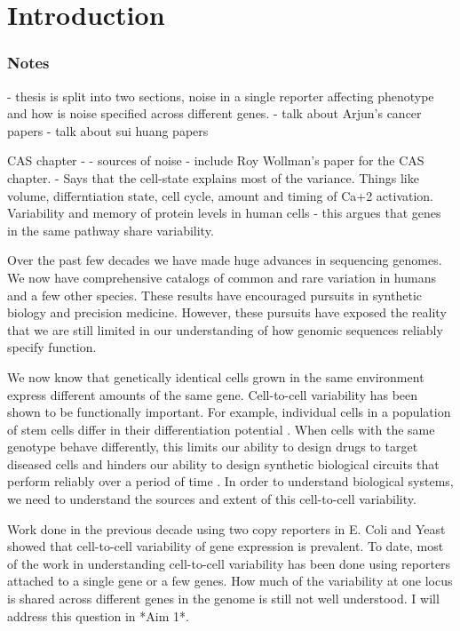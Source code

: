 \chapter{Introduction}
\label{chap:introduction}
\tightlists


\subsection{Notes}
- thesis is split into two sections, noise in a single reporter affecting phenotype and how is noise specified across different genes.
- talk about Arjun's cancer papers
- talk about sui huang papers


CAS chapter - - sources of noise
- include Roy Wollman's paper for the CAS chapter. 
    - Says that the cell-state explains most of the variance. Things like volume, differntiation state, cell cycle, amount and timing of Ca+2 activation.
Variability and memory of protein levels in human cells - this argues that genes in the same pathway share variability.


    



Over the past few decades we have made huge advances in sequencing genomes. We now have  comprehensive catalogs of common and rare variation in humans and a few other species. These results have encouraged pursuits in synthetic biology and precision medicine. However, these pursuits have exposed the reality that we are still limited in our understanding of how genomic sequences reliably specify function. 

We now know that genetically identical cells grown in the same environment express different amounts of the same gene. Cell-to-cell variability has been shown to be functionally important. For example, individual cells in a population of stem cells differ in their differentiation potential \cite{chang_transcriptome-wide_2008}. When cells with the same genotype behave differently, this limits our ability to design drugs to target diseased cells and hinders our ability to design synthetic biological circuits that perform reliably over a period of time \cite{elowitz_synthetic_2000}. In order to understand biological systems, we need to understand the sources and extent of this cell-to-cell variability.

Work done in the previous decade using two copy reporters in E. Coli \cite{elowitz_stochastic_2002} and Yeast \cite{raser_control_2004} showed that cell-to-cell variability of gene expression is prevalent. To date, most of the work in understanding cell-to-cell variability has been done using reporters attached to a single gene or a few genes. How much of the variability at one locus is shared across different genes in the genome is still not well understood. I will address this question in *Aim 1*.



